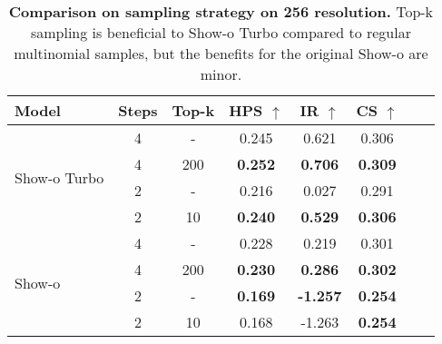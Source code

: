 \begin{table}[t]
    \centering
    \setlength{\tabcolsep}{5pt}
        \begin{tabular}{lccccccc}
            \toprule
            \textbf{Model} & \textbf{Steps} & \textbf{Top-k} & \textbf{HPS \large$\uparrow$} & \textbf{IR \large$\uparrow$} & \textbf{CS \large$\uparrow$} \\
            \midrule
            \multirow{4}{*}{Show-o Turbo} & 4 & - & 0.245 & 0.621 & 0.306 \\
             & 4 & 200 & \textbf{0.252} & \textbf{0.706} & \textbf{0.309} \\
             \cline{2-6}
            & 2 & - & 0.216 & 0.027 & 0.291 \\
             & 2 & 10 & \textbf{0.240} & \textbf{0.529} & \textbf{0.306} \\
            \midrule
            \multirow{4}{*}{Show-o} & 4 & - & 0.228 & 0.219 & 0.301\\
             & 4 & 200 & \textbf{0.230} & \textbf{0.286} & \textbf{0.302} \\
             \cline{2-6}
            & 2 & - & \textbf{0.169} & \textbf{-1.257} & \textbf{0.254} \\
             & 2 & 10 & 0.168 & -1.263 & \textbf{0.254} \\
            \bottomrule
        \end{tabular}%
    \caption{\textbf{Comparison on sampling strategy on 256 resolution.} Top-k sampling is beneficial to Show-o Turbo compared to regular multinomial samples, but the benefits for the original Show-o are minor. 
    }
    \label{tab:topk_comparison}
\end{table}





